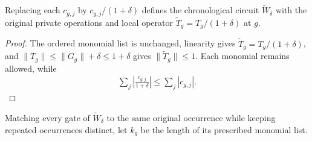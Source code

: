 \begin{definition}
    \label{def:peps_rescaled_original}
    \leanok
    Replacing each $c_{g,j}$ by $c_{g,j}/(1+\delta)$ defines the chronological
    circuit $\widetilde W_\delta$ with the original private operations and
    local operator $\widetilde T_g=T_g/(1+\delta)$ at $g$.
\end{definition}
\begin{proof}
    \leanok
    The ordered monomial list is unchanged, linearity gives
    $\widetilde T_g=T_g/(1+\delta)$, and $\|T_g\|\le\|G_g\|+\delta\le1+\delta$
    gives $\|\widetilde T_g\|\le1$. Each monomial remains allowed, while
    \begin{align}
        \sum_j\left|\frac{c_{g,j}}{1+\delta}\right|
        \le\sum_j|c_{g,j}|.
        \label{eq:peps_rescaled_coefficient_sum}
    \end{align}
\end{proof}

\begin{definition}
    \label{def:peps_rescaled_occurrences}
    \leanok
    Matching every gate of $\widetilde W_\delta$ to the same original
    occurrence while keeping repeated occurrences distinct, let $k_g$ be
    the length of its prescribed monomial list.
\end{definition}

